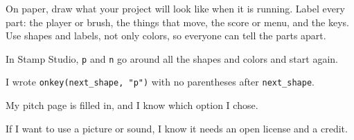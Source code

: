 \begin{creative}
On paper, draw what your project will look like when it is running. Label every part: the player or brush, the things that move, the score or menu,
and the keys. Use shapes and labels, not only colors, so everyone can tell the parts apart.
\answerspace{4.5cm}
\end{creative}

\begin{selfcheck}
  \item In Stamp Studio, \texttt{p} and \texttt{n} go around all the shapes and colors and start again.
  \item I wrote \texttt{onkey(next\_shape, "p")} with no parentheses after \texttt{next\_shape}.
  \item My pitch page is filled in, and I know which option I chose.
  \item If I want to use a picture or sound, I know it needs an open license and a credit.
\end{selfcheck}

